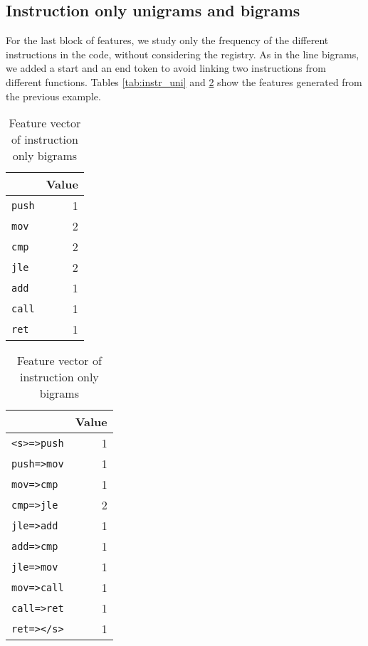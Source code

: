 \subsection{Instruction only unigrams and bigrams}
For the last block of features, we study only the frequency of the different instructions in the code, without considering the registry. As in the line bigrams, we added a start and an end token to avoid linking two instructions from different functions. Tables \ref{tab:instr_uni} and \ref{tab:instr_big} show the features generated from the previous example.

\begin{table}[!htb]
	\begin{minipage}{.5\linewidth}
		\centering
		
		\caption{Feature vector of instruction only unigrams}
		\label{tab:instr_uni}
		
		\medskip
		
		\begin{tabular}{  lr } 
			\toprule
			\makecell{ Feature }  &  Value \\   
			
			\midrule 
			\texttt{push} & 1	\\
			\texttt{mov} & 2\\
			\texttt{cmp} & 2\\
			\texttt{jle} & 2\\
			\texttt{add} & 1\\
			\texttt{call} & 1\\
			\texttt{ret} & 1\\
			\bottomrule
		\end{tabular}
	\end{minipage}\hfill
	\begin{minipage}{.5\linewidth}
		\centering
		
		\caption{Feature vector of instruction only bigrams}
		\label{tab:instr_big}
		
		\medskip
		
		\begin{tabular}{  lr } 
			\toprule
			\makecell{ Feature }  &  Value \\   
			
			\midrule 
			\texttt{<s>=>push} & 1	\\
			\texttt{push=>mov} & 1\\
			\texttt{mov=>cmp} & 1\\
			\texttt{cmp=>jle} & 2\\
			\texttt{jle=>add} & 1\\
			\texttt{add=>cmp} & 1\\
			\texttt{jle=>mov} & 1\\
			\texttt{mov=>call} & 1\\
			\texttt{call=>ret} & 1\\
			\texttt{ret=></s>} & 1\\
			\bottomrule
		\end{tabular}
	\end{minipage}
\end{table}


